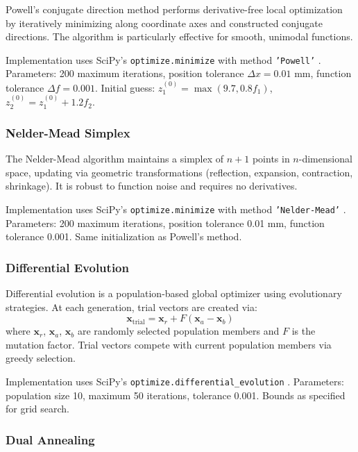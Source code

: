 Powell's conjugate direction method \cite{powell1964} performs derivative-free local optimization by iteratively minimizing along coordinate axes and constructed conjugate directions. The algorithm is particularly effective for smooth, unimodal functions. 

Implementation uses SciPy's \texttt{optimize.minimize} with method \texttt{'Powell'} \cite{scipy}. Parameters: 200 maximum iterations, position tolerance $\Delta x = 0.01$ mm, function tolerance $\Delta f = 0.001$. Initial guess: $z_1^{(0)} = \max(9.7, 0.8f_1)$, $z_2^{(0)} = z_1^{(0)} + 1.2f_2$.

\subsubsection{Nelder-Mead Simplex}

The Nelder-Mead algorithm \cite{nelder1965} maintains a simplex of $n+1$ points in $n$-dimensional space, updating via geometric transformations (reflection, expansion, contraction, shrinkage). It is robust to function noise and requires no derivatives.

Implementation uses SciPy's \texttt{optimize.minimize} with method \texttt{'Nelder-Mead'} \cite{scipy}. Parameters: 200 maximum iterations, position tolerance 0.01 mm, function tolerance 0.001. Same initialization as Powell's method.

\subsubsection{Differential Evolution}

Differential evolution \cite{storn1997} is a population-based global optimizer using evolutionary strategies. At each generation, trial vectors are created via:
\begin{equation}
\mathbf{x}_{\text{trial}} = \mathbf{x}_r + F(\mathbf{x}_a - \mathbf{x}_b)
\end{equation}
where $\mathbf{x}_r$, $\mathbf{x}_a$, $\mathbf{x}_b$ are randomly selected population members and $F$ is the mutation factor. Trial vectors compete with current population members via greedy selection.

Implementation uses SciPy's \texttt{optimize.}\allowbreak\texttt{differential\_evolution} \cite{scipy}. Parameters: population size 10, maximum 50 iterations, tolerance 0.001. Bounds as specified for grid search.

\subsubsection{Dual Annealing}

